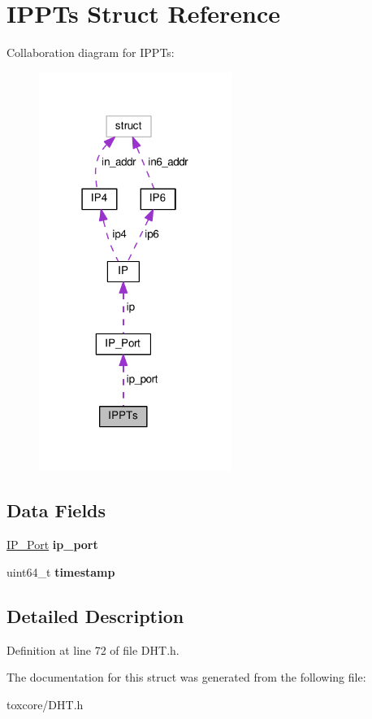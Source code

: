\hypertarget{struct_i_p_p_ts}{\section{I\+P\+P\+Ts Struct Reference}
\label{struct_i_p_p_ts}
}


Collaboration diagram for I\+P\+P\+Ts\+:
\nopagebreak
\begin{figure}[H]
\begin{center}
\leavevmode
\includegraphics[width=178pt]{struct_i_p_p_ts__coll__graph}
\end{center}
\end{figure}
\subsection*{Data Fields}
\begin{DoxyCompactItemize}
\item 
\hypertarget{struct_i_p_p_ts_a86e2a5a56c0dd22df6e8b8a10e40f9e4}{\hyperlink{struct_i_p___port}{I\+P\+\_\+\+Port} {\bfseries ip\+\_\+port}}\label{struct_i_p_p_ts_a86e2a5a56c0dd22df6e8b8a10e40f9e4}

\item 
\hypertarget{struct_i_p_p_ts_a465bef81f6478756e5443025b1f2ddfa}{uint64\+\_\+t {\bfseries timestamp}}\label{struct_i_p_p_ts_a465bef81f6478756e5443025b1f2ddfa}

\end{DoxyCompactItemize}


\subsection{Detailed Description}


Definition at line 72 of file D\+H\+T.\+h.



The documentation for this struct was generated from the following file\+:\begin{DoxyCompactItemize}
\item 
toxcore/D\+H\+T.\+h\end{DoxyCompactItemize}
